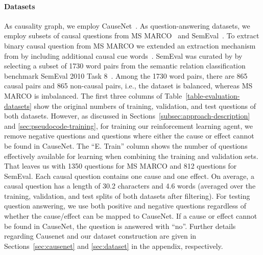 \paragraph{Datasets} As causality graph, we employ CauseNet~\cite{Heindorf2020Causenet}. As ques\-tion-answering datasets, we employ subsets of causal questions from MS MARCO~\cite{Nguyen2016MSMARCO} and SemEval~\cite{Hendrickx2010SemEval, SharpCausalQAEmbeddings2016}. To extract binary causal question from MS MARCO we extended an extraction mechanism from \citet{Heindorf2020Causenet} by including additional causal cue words~\cite{Girju2002CausalCue}. SemEval was curated by \citet{SharpCausalQAEmbeddings2016} by selecting a subset of 1730 word pairs from the semantic relation classification benchmark SemEval 2010 Task 8~\cite{Hendrickx2010SemEval}. Among the 1730 word pairs, there are 865 causal pairs and 865 non-causal pairs, i.e., the dataset is balanced, whereas MS MARCO is imbalanced. The first three columns of Table~\ref{table-evaluation-datasets} show the original numbers of training, validation, and test questions of both datasets. However, as discussed in Sections~\ref{subsec:approach-description} and \ref{sec:pseudocode-training}, for training our reinforcement learning agent, we remove negative questions and questions where either the cause or effect cannot be found in CauseNet. The ``E. Train'' column shows the number of questions effectively available for learning when combining the training and validation sets. That leaves us with 1350 questions for MS MARCO and 812 questions for SemEval. Each causal question contains one cause and one effect. On average, a causal question has a length of 30.2 characters and 4.6 words (averaged over the training, validation, and test splits of both datasets after filtering). For testing question answering, we use both positive and negative questions regardless of whether the cause/effect can be mapped to CauseNet. If a cause or effect cannot be found in CauseNet, the question is answered with ``no''. Further details regarding Causenet and our dataset construction are given in Sections~\ref{sec:causenet} and \ref{sec:dataset} in the appendix, respectively.


